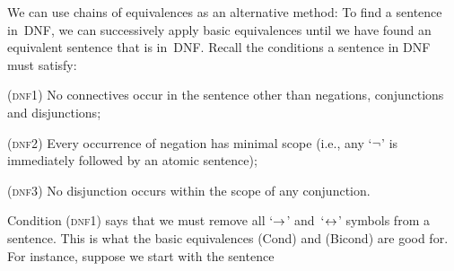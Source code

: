 We can use chains of equivalences as an alternative method: To find a sentence in~DNF, we can successively apply basic equivalences until we have found an equivalent sentence that is in~DNF. Recall the conditions a sentence in DNF must satisfy:
\begin{earg}
	\item[(\textsc{dnf1})] No connectives occur in the sentence other than negations, conjunctions and disjunctions;
	\item[(\textsc{dnf2})] Every occurrence of negation has minimal scope (i.e., any `$\neg$' is immediately followed by an atomic sentence);
	\item[(\textsc{dnf3})] No disjunction occurs within the scope of any conjunction.
\end{earg}
Condition (\textsc{dnf1}) says that we must remove all `$\rightarrow$' and~`$\leftrightarrow$' symbols from a sentence.  This is what the basic equivalences (Cond) and (Bicond) are good for.  For instance, suppose we start with the sentence
